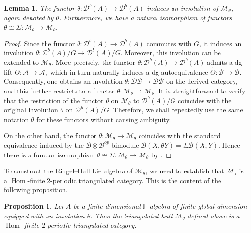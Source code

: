 \documentclass[12pt,reqno]{amsart}
\numberwithin{equation}{section}
\newcommand{\Hom}{\operatorname{Hom}\nolimits}
\newtheorem{lemma}[theorem]{Lemma}
\newtheorem{proposition}[theorem]{Proposition}
\begin{document}
	\begin{lemma}\label{lem:theta-in-M}
		The functor $\theta:\mathcal{D}^b(A)\rightarrow \mathcal{D}^b(A)$ induces an involution of $\mathcal{M}_\theta$, again denoted by $\theta$. Furthermore, we have a natural isomorphism of functors
		$\theta \cong \Sigma:\mathcal{M}_\theta \rightarrow \mathcal{M}_\theta .$
	\end{lemma}
	\begin{proof}
		Since the functor $\theta:\mathcal{D}^b(A)\rightarrow \mathcal{D}^b(A)$ commutes with $G$, it induces an involution
		$\theta:\mathcal{D}^b(A)/G\rightarrow \mathcal{D}^b(A)/G.$
		Moreover, this involution can be extended to $\mathcal{M}_\theta$. More precisely, the functor
		$\theta:\mathcal{D}^b(A)\rightarrow \mathcal{D}^b(A)$
		admits a dg lift
		$\Theta:\mathcal{A}\rightarrow \mathcal{A},$
		which in turn naturally induces a dg autoequivalence
		$\widetilde{\Theta}:\mathcal{B}\rightarrow \mathcal{B}.$
		Consequently, one obtains an involution
		$\theta:\mathcal{D}\mathcal{B}\rightarrow \mathcal{D}\mathcal{B}$
		on the derived category, and this further restricts to a functor
		$\theta:\mathcal{M}_\theta\rightarrow \mathcal{M}_\theta.$
		It is straightforward to verify that the restriction of the functor $\theta$ on $\mathcal{M}_\theta$ to $\mathcal{D}^b(A)/G$ coincides with the original involution $\theta$ on $\mathcal{D}^b(A)/G$. Therefore, we shall repeatedly use the same notation $\theta$ for these functors without causing ambiguity.
		
		On the other hand, the functor
		$\theta:\mathcal{M}_\theta\rightarrow\mathcal{M}_\theta$
		coincides with the standard equivalence induced by the $\mathcal{B}\otimes \mathcal{B}^{op}$-bimodule
		$\mathcal{B}(X,\theta Y)=\Sigma\mathcal{B}(X,Y).$
		Hence there is a functor isomorphism
		$\theta\cong \Sigma:\mathcal{M}_\theta\rightarrow\mathcal{M}_\theta$ by \cite[Lemma 6.1]{Ke94-dg-cat}. 
	\end{proof}
	
	To construct the Ringel--Hall Lie algebra of $\mathcal{M}_\theta$, we need to
	establish that $\mathcal{M}_\theta$ is a $\Hom$-finite
	$2$-periodic triangulated category. This is the content of the following
	proposition.
	
	\begin{proposition}\label{pro:M_theta-2-periodic}
		Let $A$ be a finite-dimensional $\mathbb{F}$-algebra of finite global
		dimension equipped with an involution $\theta$. Then the triangulated hull
		$\mathcal{M}_{\theta}$ defined above is a $\Hom$-finite $2$-periodic
		triangulated category. 
	\end{proposition}
	
\end{document}
